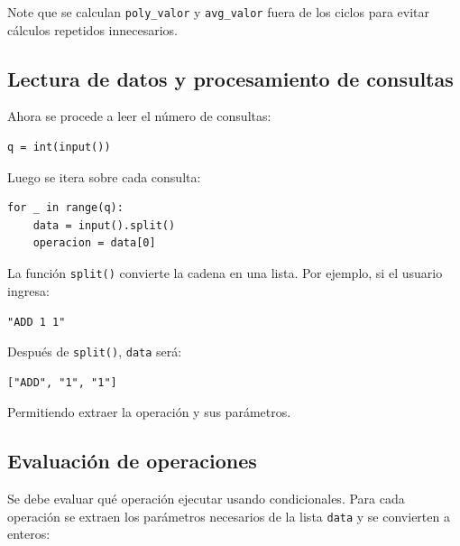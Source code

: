 \documentclass{article}
\begin{document}
Note que se calculan \texttt{poly\_valor} y \texttt{avg\_valor} fuera de los ciclos para evitar cálculos repetidos innecesarios.

\subsection{Lectura de datos y procesamiento de consultas}

Ahora se procede a leer el número de consultas:

\begin{lstlisting}[style=pythonstyle]
q = int(input())
\end{lstlisting}

Luego se itera sobre cada consulta:

\begin{lstlisting}[style=pythonstyle]
for _ in range(q):
    data = input().split()
    operacion = data[0]
\end{lstlisting}

La función \lstinline[style=pythonstyle]|split()| convierte la cadena en una lista. Por ejemplo, si el usuario ingresa:

\texttt{"ADD 1 1"}

Después de \lstinline[style=pythonstyle]|split()|, \texttt{data} será:

\begin{lstlisting}[style=pythonstyle]
["ADD", "1", "1"]
\end{lstlisting}

Permitiendo extraer la operación y sus parámetros.

\subsection{Evaluación de operaciones}

Se debe evaluar qué operación ejecutar usando condicionales. Para cada operación se extraen los parámetros necesarios de la lista \texttt{data} y se convierten a enteros:
\end{document}
